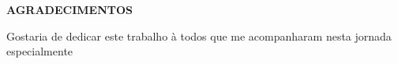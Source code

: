 \begin{center}
    \textbf{\normalsize AGRADECIMENTOS}
\end{center}

\vspace{1cm}

Gostaria de dedicar este trabalho à todos que me acompanharam nesta jornada especialmente 


\thispagestyle{empty}